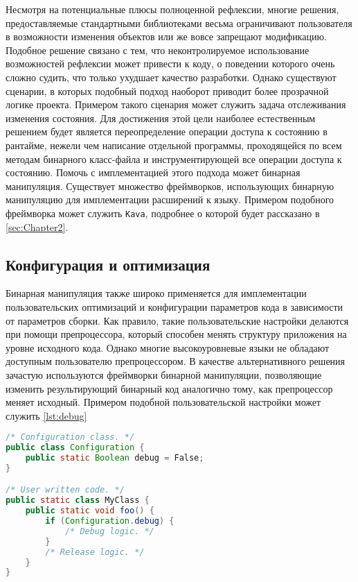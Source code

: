 Несмотря на потенциальные плюсы полноценной рефлексии, многие решения, предоставляемые стандартными библиотеками весьма ограничивают пользователя в возможности изменения объектов или же вовсе запрещают модификацию. Подобное решение связано с тем, что неконтролируемое использование возможностей рефлексии может привести к коду, о поведении которого очень сложно судить, что только ухудшает качество разработки. Однако существуют сценарии, в которых подобный подход наоборот приводит более прозрачной логике проекта. Примером такого сценария может служить задача отслеживания изменения состояния. Для достижения этой цели наиболее естественным решением будет является переопределение операции доступа к состоянию в рантайме, нежели чем написание отдельной программы, проходящейся по всем методам бинарного класс-файла и инструментирующей все операции доступа к состоянию. Помочь с имплементацией этого подхода может бинарная манипуляция. Существует множество фреймворков, использующих бинарную манипуляцию для имплементации расширений к языку. Примером подобного фреймворка может служить \texttt{Kava}, подробнее о которой будет рассказано в \autoref{sec:Chapter2}.

\subsection{Конфигурация и оптимизация}

Бинарная манипуляция также широко применяется для имплементации пользовательских оптимизаций и конфигурации параметров кода в зависимости от параметров сборки. Как правило, такие пользовательские настройки делаются при помощи препроцессора, который способен менять структуру приложения на уровне исходного кода. Однако многие высокоуровневые языки не обладают доступным пользователю препроцессором. В качестве альтернативного решения зачастую используются фреймворки бинарной манипуляции, позволяющие изменить результирующий бинарный код аналогично тому, как препроцессор меняет исходный. Примером подобной пользовательской настройки может служить \autoref{lst:debug}

\begin{lstlisting}[language=Java, caption=Пример использования класса с конфигурацией проекта, label=lst:debug]
/* Configuration class. */
public class Configuration {
    public static Boolean debug = False;
}

/* User written code. */
public static class MyClass {
    public static void foo() {
        if (Configuration.debug) {
            /* Debug logic. */
        }
        /* Release logic. */
    }
}
\end{lstlisting}

